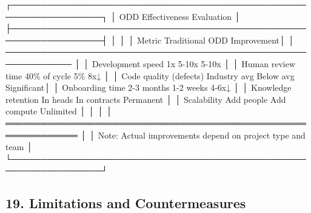 \documentclass[
]{article}
\newenvironment{Shaded}{}{}
\newcommand{\NormalTok}[1]{#1}
\begin{document}
\begin{Shaded}
\begin{Highlighting}[]
\NormalTok{┌─────────────────────────────────────────────────────────────────┐}
\NormalTok{│                   ODD Effectiveness Evaluation                   │}
\NormalTok{├─────────────────────────────────────────────────────────────────┤}
\NormalTok{│                                                                  │}
\NormalTok{│  Metric                    Traditional    ODD        Improvement│}
\NormalTok{│  ─────────────────────────────────────────────────────────────  │}
\NormalTok{│  Development speed         1x             5{-}10x      5{-}10x      │}
\NormalTok{│  Human review time         40\% of cycle   5\%         8x↓        │}
\NormalTok{│  Code quality (defects)    Industry avg   Below avg  Significant│}
\NormalTok{│  Onboarding time           2{-}3 months     1{-}2 weeks  4{-}6x↓      │}
\NormalTok{│  Knowledge retention       In heads       In contracts Permanent │}
\NormalTok{│  Scalability               Add people     Add compute Unlimited │}
\NormalTok{│                                                                  │}
\NormalTok{│  ══════════════════════════════════════════════════════════════  │}
\NormalTok{│  Note: Actual improvements depend on project type and team      │}
\NormalTok{└─────────────────────────────────────────────────────────────────┘}
\end{Highlighting}
\end{Shaded}

\hypertarget{19-limitations-and-countermeasures}{%
\subsection{19. Limitations and
Countermeasures}\label{19-limitations-and-countermeasures}}
\end{document}
